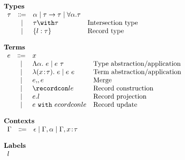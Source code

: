 \[
\begin{array}{l}

    \textbf{Types} \\
    \begin{array}{rcll}
        \ty & \Coloneqq & \alpha \mid \ty \to \ty \mid \forall \alpha. \ty & \\
          & \mid      & \ty \intersects \ty                                  & \text{Intersection type} \\
          & \mid      & \recordtype l \ty                            & \text{Record type}
    \end{array} \\ \\

    \textbf{Terms} \\
    \begin{array}{rcll}
        e & \Coloneqq & x                               & \\
          & \mid      & \Abs \alpha     e \mid \app e \ty & \text{Type abstraction/application} \\
          & \mid      & \abs {\rel x \ty} e \mid \app e e & \text{Term abstraction/application} \\
          & \mid      & e \dcomma e                     & \text{Merge} \\
          & \mid      & \recordcon l e                & \text{Record construction} \\
          & \mid      & e.l                             & \text{Record projection} \\
          & \mid      & \recordupdate e l e             & \text{Record update}
    \end{array} \\ \\

    \textbf{Contexts} \\
    \begin{array}{rcl}
        \Gamma & \Coloneqq & \epsilon \mid \Gamma, \alpha \mid \Gamma, \rel x \ty
    \end{array} \\ \\

    \textbf{Labels} \\
    \begin{array}{r}
        l
    \end{array}

\end{array}
\]

